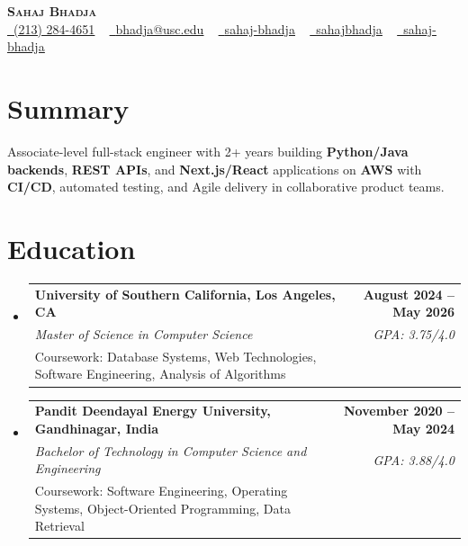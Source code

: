 \documentclass[letterpaper,10pt]{article}
\makeatletter
\newcommand{\resumeEduSubheading}[5]{\vspace{-1pt}\item\begin{tabular*}{1.0\textwidth}[t]{l@{\extracolsep{\fill}}r}\textbf{#1} & \textbf{\small #2} \\\textit{\small #3} & \textit{\small #4} \\\small #5 & \\\end{tabular*}\vspace{-4pt}}
\newcommand{\resumeSubHeadingListStart}{\begin{itemize}[leftmargin=0.0in, label={}]}
\newcommand{\resumeSubHeadingListEnd}{\end{itemize}}
\makeatother
\begin{document}
\begin{center}
{\Huge \scshape \textbf{Sahaj Bhadja}} \\ \vspace{1pt}
\small \href{tel:(213) 284-4651}{\faPhone\ \underline{(213) 284-4651}} ~ \href{mailto:bhadja@usc.edu}{\raisebox{-0.2\height}\faEnvelope\ \underline{bhadja@usc.edu}} ~
\href{https://www.linkedin.com/in/sahaj-bhadja/}{\raisebox{-0.2\height}\faLinkedin\ \underline{sahaj-bhadja}} ~ \href{https://github.com/SAHAJ-BHADJA}{\raisebox{-0.2\height}\faGithub\ \underline{sahajbhadja}} ~
\href{https://sahaj-bhadja.vercel.app/}{\raisebox{-0.2\height}\faGlobe\ \underline{sahaj-bhadja}}
\end{center}
\vspace{-18pt}
\section{Summary}
\begin{itemize}[leftmargin=0.15in, label={}]
\small{\item{Associate-level full-stack engineer with 2+ years building \textbf{Python/Java backends}, \textbf{REST APIs}, and \textbf{Next.js/React} applications on \textbf{AWS} with \textbf{CI/CD}, automated testing, and Agile delivery in collaborative product teams.}}
\end{itemize}
\vspace{-16pt}
\section{Education}
\resumeSubHeadingListStart
\resumeEduSubheading{University of Southern California, Los Angeles, CA}{August 2024 -- May 2026}{Master of Science in Computer Science}{GPA: 3.75/4.0}{Coursework: Database Systems, Web Technologies, Software Engineering, Analysis of Algorithms}
\vspace{-9pt}
\resumeEduSubheading{Pandit Deendayal Energy University, Gandhinagar, India}{November 2020 -- May 2024}{Bachelor of Technology in Computer Science and Engineering}{GPA: 3.88/4.0}{Coursework: Software Engineering, Operating Systems, Object-Oriented Programming, Data Retrieval}
\resumeSubHeadingListEnd
\vspace{-14pt}
\end{document}
